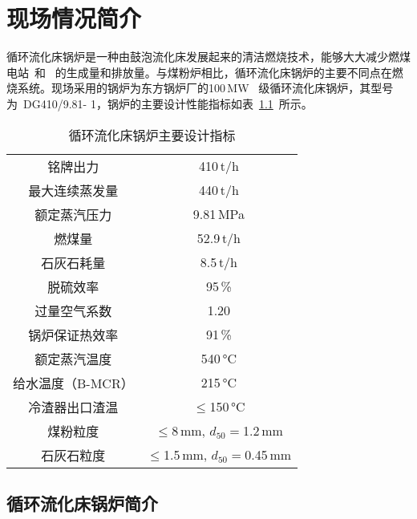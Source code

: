 \chapter{现场情况简介}

循环流化床锅炉是一种由鼓泡流化床发展起来的清洁燃烧技术，能够大大减少燃煤电站~和~ 的生成量和排放量。与煤粉炉相比，循环流化床锅炉的主要不同点在燃烧系统。现场采用的锅炉为东方锅炉厂的100$\,$\si{\mega\watt}~ 级循环流化床锅炉，其型号为~DG410/9.81- 1，锅炉的主要设计性能指标如表~\ref{tab:cfbb}~所示。
\begingroup
\renewcommand*{\arraystretch}{1.67}
\begin{table}[!h]
\small
\centering
\caption[循环流化床锅炉主要设计指标]{循环流化床锅炉主要设计指标} \label{tab:cfbb}
\begin{tabular}{c|c}
\hline\hline
铭牌出力    &   410$\,$\si[per-mode=symbol]{\tonne\per\hour} \\
最大连续蒸发量 &   440$\,$\si[per-mode=symbol]{\tonne\per\hour} \\
额定蒸汽压力  &   9.81$\,$\si{\mega\pascal} \\
燃煤量 &   52.9$\,$\si[per-mode=symbol]{\tonne\per\hour} \\
石灰石耗量   &   8.5$\,$\si[per-mode=symbol]{\tonne\per\hour} \\
脱硫效率    &   95$\,$\si{\percent} \\
过量空气系数  &   1.20 \\
锅炉保证热效率 &   91$\,$\si{\percent} \\
额定蒸汽温度  &   540$\,$\si{\degreeCelsius} \\
给水温度（B-MCR）  &   215$\,$\si{\degreeCelsius} \\
冷渣器出口渣温 &   $\leq$150$\,$\si{\degreeCelsius} \\
煤粉粒度    &   $\leq$8$\,$\si{\mm},  $d_{50} = $1.2$\,$\si{\mm} \\
石灰石粒度   &   $\leq$1.5$\,$\si{\mm},  $d_{50} = $0.45$\,$\si{\mm} \\
\hline\hline
\end{tabular}
\end{table}
\endgroup


\section{循环流化床锅炉简介}

